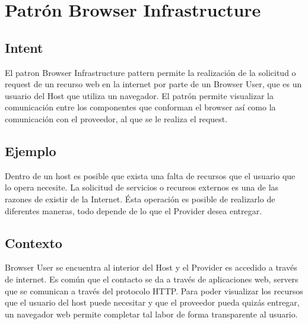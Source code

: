 \section{Patrón Browser Infrastructure}
\label{chap4:BrokerPatt}
\subsection{Intent}
El patron Browser Infrastructure pattern permite la realización de la solicitud o request de un recurso web en la internet por parte de un Browser User, que es un usuario del Host que utiliza un navegador. El patrón permite visualizar la comunicación entre los componentes que conforman el browser así como la comunicación con el proveedor, al que se le realiza el request.

\subsection{Ejemplo}
Dentro de un host es posible que exista una falta de recursos que el usuario que lo opera necesite. La solicitud de servicios o recursos externos es una de las razones de existir de la Internet. Ésta operación es posible de realizarlo de diferentes maneras, todo depende de lo que el Provider desea entregar.

\subsection{Contexto}
Browser User se encuentra al interior del Host y el Provider es accedido a través de internet.  Es común que el contacto se da a través de aplicaciones web, servers que se comunican a través del protocolo HTTP. Para poder visualizar los recursos que el usuario del host puede necesitar y que el proveedor pueda quizás entregar, un navegador web permite completar tal labor de forma transparente al usuario.
